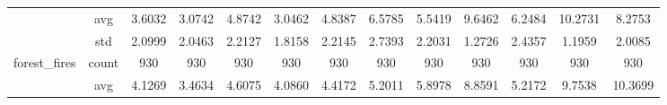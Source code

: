 \begin{table}[htbp]
{\begin{tabular}{rcccccccccccc}
			                                   & avg                                    & 3.6032                                                                             & 3.0742                                                                    & 4.8742                                                                    & \cellcolor[rgb]{ .776,  .937,  .808}\textcolor[rgb]{ 0,  .38,  0}{3.0462} & 4.8387                                        & 6.5785                                      & 5.5419                                         & 9.6462                                         & 6.2484                                         & 10.2731                                        & 8.2753                                         \\
			                                   & std                                    & 2.0999                                                                             & 2.0463                                                                    & 2.2127                                                                    & 1.8158                                                                    & 2.2145                                        & 2.7393                                      & 2.2031                                         & 1.2726                                         & 2.4357                                         & 1.1959                                         & 2.0085                                         \\
			forest\_fires                      & count                                  & 930                                                                                & 930                                                                       & 930                                                                       & 930                                                                       & 930                                           & 930                                         & 930                                            & 930                                            & 930                                            & 930                                            & 930                                            \\
			                                   & avg                                    & 4.1269                                                                             & \cellcolor[rgb]{ .776,  .937,  .808}\textcolor[rgb]{ 0,  .38,  0}{3.4634} & 4.6075                                                                    & 4.0860                                                                    & 4.4172                                        & 5.2011                                      & 5.8978                                         & 8.8591                                         & 5.2172                                         & 9.7538                                         & 10.3699                                        \\

\end{tabular}}
\end{table}
